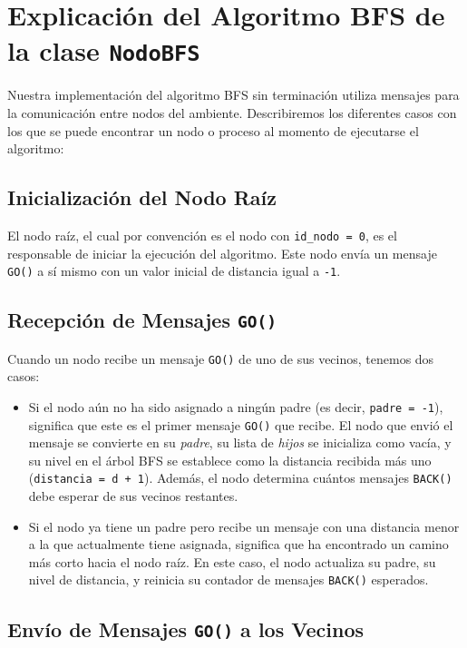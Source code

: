 \section{Explicación del Algoritmo BFS de la clase \texttt{NodoBFS}}

Nuestra implementación del algoritmo BFS sin terminación utiliza mensajes para la comunicación entre nodos del ambiente. Describiremos los diferentes casos con los que se puede encontrar un nodo o proceso al momento de ejecutarse el algoritmo:

\subsection{Inicialización del Nodo Raíz}

El nodo raíz, el cual por convención es el nodo con \texttt{id\_nodo = 0}, es el responsable de iniciar la ejecución del algoritmo. Este nodo envía un mensaje \texttt{GO()} a sí mismo con un valor inicial de distancia igual a \texttt{-1}. 

\subsection{Recepción de Mensajes \texttt{GO()}}

Cuando un nodo recibe un mensaje \texttt{GO()} de uno de sus vecinos, tenemos dos casos:

\begin{itemize}
	\item Si el nodo aún no ha sido asignado a ningún padre (es decir, \texttt{padre = -1}), significa que este es el primer mensaje \texttt{GO()} que recibe. El nodo que envió el mensaje se convierte en su \textit{padre}, su lista de \textit{hijos} se inicializa como vacía, y su nivel en el árbol BFS se establece como la distancia recibida más uno (\texttt{distancia = d + 1}). Además, el nodo determina cuántos mensajes \texttt{BACK()} debe esperar de sus vecinos restantes.
	
	\item Si el nodo ya tiene un padre pero recibe un mensaje con una distancia menor a la que actualmente tiene asignada, significa que ha encontrado un camino más corto hacia el nodo raíz. En este caso, el nodo actualiza su padre, su nivel de distancia, y reinicia su contador de mensajes \texttt{BACK()} esperados. 
\end{itemize}

\subsection{Envío de Mensajes \texttt{GO()} a los Vecinos}

